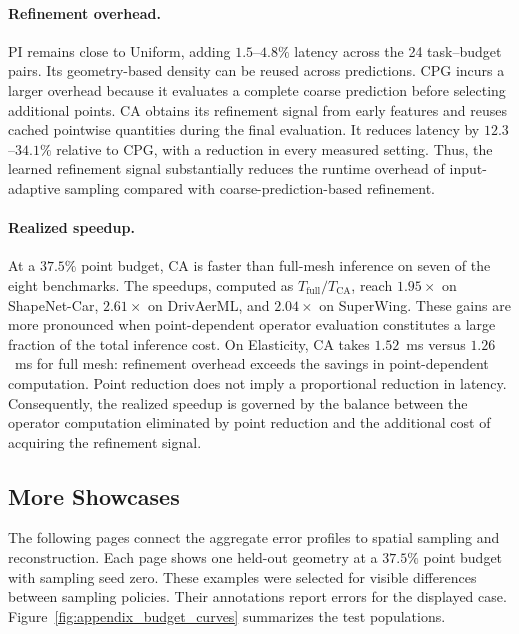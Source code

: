 \documentclass{article}
\begin{document}
\paragraph{Refinement overhead.}
PI remains close to Uniform, adding $1.5$--$4.8\%$ latency across the
24 task--budget pairs. Its geometry-based density can be reused across
predictions. CPG incurs a larger overhead because it evaluates a complete
coarse prediction before selecting additional points. CA obtains its
refinement signal from early features and reuses cached pointwise
quantities during the final evaluation. It reduces latency by
$12.3$--$34.1\%$ relative to CPG, with a reduction in every measured
setting. Thus, the learned refinement signal substantially reduces the
runtime overhead of input-adaptive sampling compared with
coarse-prediction-based refinement.

\paragraph{Realized speedup.}
At a $37.5\%$ point budget, CA is faster than full-mesh inference on seven
of the eight benchmarks. The speedups, computed as
$T_{\mathrm{full}}/T_{\mathrm{CA}}$, reach $1.95\times$ on ShapeNet-Car,
$2.61\times$ on DrivAerML, and $2.04\times$ on SuperWing.
These gains are more pronounced when
point-dependent operator evaluation constitutes a large fraction of the
total inference cost. On Elasticity, CA takes $1.52$~ms versus $1.26$~ms
for full mesh: refinement overhead exceeds the savings in point-dependent
computation.
Point reduction does not imply a proportional reduction in latency.
Consequently, the realized speedup is governed by the balance between the
operator computation eliminated by point reduction and the additional
cost of acquiring the refinement signal.


\clearpage
\subsection{More Showcases}
\label{app:field_visualizations}

The following pages connect the aggregate error profiles to spatial sampling
and reconstruction. Each page shows one held-out geometry at a $37.5\%$ point
budget with sampling seed zero. These examples were selected for visible
differences between sampling policies. Their annotations report errors for
the displayed case. Figure~\ref{fig:appendix_budget_curves} summarizes
the test populations.
\end{document}
